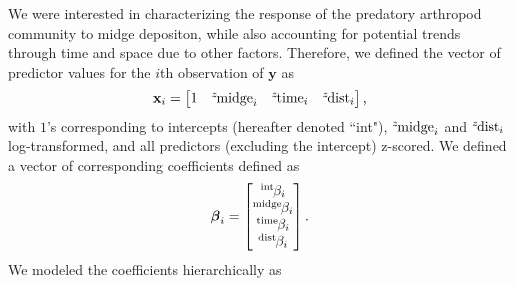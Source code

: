 We were interested in characterizing the response of the predatory arthropod
community to midge depositon, while also accounting for potential trends through
time and space due to other factors.
Therefore, we defined the vector of predictor values for the $i$th observation
of $\mathbf{y}$ as
%
\begin{equation} \label{eq:x-vec}
    \mathbf{x}_i = \begin{bmatrix}
        1 & {}^z\hspace*{-1pt}\text{midge}_i &
        {}^z\hspace*{-1pt}\text{time}_i & {}^z\hspace*{-1pt}\text{dist}_i
    \end{bmatrix}\text{,}
\end{equation}
%
\noindent with $1$'s corresponding to intercepts (hereafter denoted ``int"),
${}^z\hspace*{-1pt}\text{midge}_i$ and ${}^z\hspace*{-1pt}\text{dist}_i$ log-transformed,
and all predictors (excluding the intercept) z-scored.
We defined a vector of corresponding coefficients defined as
%
\begin{equation} \label{eq:beta-vec}
{\boldsymbol\beta}_i = \begin{bmatrix}
    {}^\text{int}\hspace*{-1pt}\beta_i \\
    {}^\text{midge}\hspace*{-1pt}\beta_i \\
    {}^\text{time}\hspace*{-1pt}\beta_i \\
    {}^\text{dist}\hspace*{-1pt}\beta_i
    \end{bmatrix}\text{.}
\end{equation}
%
\noindent We modeled the coefficients hierarchically \citep[following][]{Jackson2012} as
%
